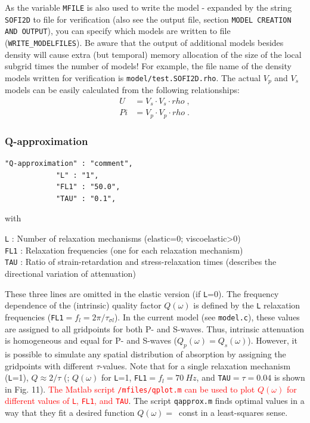 As the variable \texttt{MFILE} is also used to write the model - expanded by the string \texttt{SOFI2D} to file for verification (also see the output file, section \texttt{MODEL CREATION AND OUTPUT}), you can specify which models are written to file (\texttt{WRITE\_MODELFILES}). Be aware that the output of additional models besides density will cause extra (but temporal) memory allocation of the size of the local subgrid times the number of models! For example, the file name of the density models written for verification is \texttt{model/test.SOFI2D.rho}. The actual $V_p$ and $V_s$ models can be easily calculated from the following relationships:
\begin{subequations}
    \begin{align}
        U &= V_s \cdot V_s \cdot rho\;,\\
        Pi &= V_p \cdot V_p \cdot rho\;.
        \label{eq_U_PI}
    \end{align}
\end{subequations}
    
\subsubsection{Q-approximation}
\label{Q-approximation}
\begin{verbatim}
"Q-approximation" : "comment",
            "L" : "1",
            "FL1" : "50.0", 
            "TAU" : "0.1",
\end{verbatim}

with 

\texttt{L} : Number of relaxation mechanisms (elastic=0; viscoelastic>0)\\
\texttt{FL1} : Relaxation frequencies (one for each relaxation mechanism)\\
\texttt{TAU} : Ratio of strain-retardation and stress-relaxation times (describes the directional variation of attenuation)

These three lines are omitted in the elastic version (if \texttt{L}=0). The frequency dependence of the (intrinsic) quality factor $Q(\omega)$ is defined by the \texttt{L} relaxation frequencies (\texttt{FL1}$=f_l=2\pi/\tau_{\sigma l}$). In the current model (see \texttt{model.c}), these values are assigned to all gridpoints for both P- and S-waves. Thus, intrinsic attenuation is homogeneous and equal for P- and S-waves ($Q_p(\omega)=Q_s(\omega)$). However, it is possible to simulate any spatial distribution of absorption by assigning the gridpoints with different $\tau$-values. Note that for a single relaxation mechanism (\texttt{L}=1), $Q \approx 2/\tau$ (\cite{bohlen:02}; $Q(\omega)$ for \texttt{L}=1, \texttt{FL1}$ =f_l=\SI{70}{Hz}$, and \texttt{TAU}$=\tau=0.04$ is shown in Fig. 11). \textcolor{red}{The Matlab script \texttt{/mfiles/qplot.m} can be used to plot $Q(\omega)$ for different values of \texttt{L}, \texttt{FL1}, and \texttt{TAU}}. The script \texttt{qapprox.m} finds optimal values in a way that they fit a desired function $Q(\omega)=$~const in a least-squares sense.

